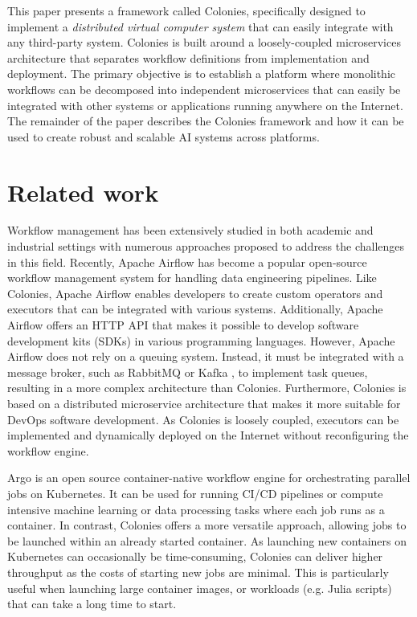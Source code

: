 \documentclass{article}
\begin{document}
This paper presents a framework called Colonies, specifically designed to implement a \emph{distributed virtual computer system} that can easily integrate with any third-party system. Colonies is built around a loosely-coupled microservices architecture that separates workflow definitions from implementation and deployment. The primary objective is to establish a platform where monolithic workflows can be decomposed into independent microservices that can easily be integrated with other systems or applications running anywhere on the Internet. The remainder of the paper describes the Colonies framework and how it can be used to create robust and scalable AI systems across platforms. 

\section{Related work}
Workflow management has been extensively studied in both academic and industrial settings with numerous approaches \cite{service_wfs, schmitt2022workflow, GarciaRepresa1740746, Ouyang2010, NIKOLOV2021100440, workflow_in_bigdata} proposed to address the challenges in this field. Recently, Apache Airflow \cite{apache_airflow} has become a popular open-source workflow management system for handling data engineering pipelines. Like Colonies, Apache Airflow enables developers to create custom operators and executors that can be integrated with various systems. Additionally, Apache Airflow offers an HTTP API that makes it possible to develop software development kits (SDKs) in various programming languages. However, Apache Airflow does not rely on a queuing system. Instead, it must be integrated with a message broker, such as RabbitMQ \cite{rabbitmq} or Kafka \cite{apache_kafka}, to implement task queues, resulting in a more complex architecture than Colonies. Furthermore, Colonies is based on a distributed microservice architecture that makes it more suitable for DevOps software development. As Colonies is loosely coupled, executors can be implemented and dynamically deployed on the Internet without reconfiguring the workflow engine.

Argo \cite{argowf} is an open source container-native workflow engine for orchestrating parallel jobs on Kubernetes. It can be used for running CI/CD pipelines or compute intensive machine learning or data processing tasks where each job runs as a container. In contrast, Colonies offers a more versatile approach, allowing jobs to be launched within an already started container. As launching new containers on Kubernetes can occasionally be time-consuming, Colonies can deliver higher throughput as the costs of starting new jobs are minimal. This is particularly useful when launching large container images, or workloads (e.g. Julia scripts) that can take a long time to start. 
\end{document}
